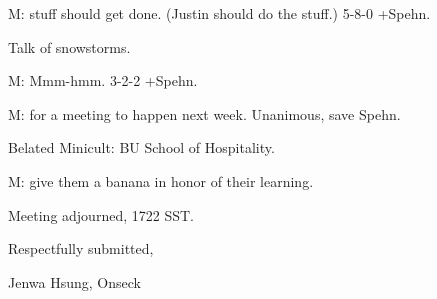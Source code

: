 \documentclass[12pt]{article}
\begin{document}
M: stuff should get done. (Justin should do the stuff.) 5-8-0 +Spehn.

Talk of snowstorms.

M: Mmm-hmm. 3-2-2 +Spehn.

M: for a meeting to happen next week. Unanimous, save Spehn.

Belated Minicult: BU School of Hospitality.

M: give them a banana in honor of their learning.

\vspace{12pt}

\noindent
Meeting adjourned, 1722 SST.

\vspace{18pt}

\centerline{Respectfully submitted,}
\centerline{Jenwa Hsung, Onseck}
\end{document}

